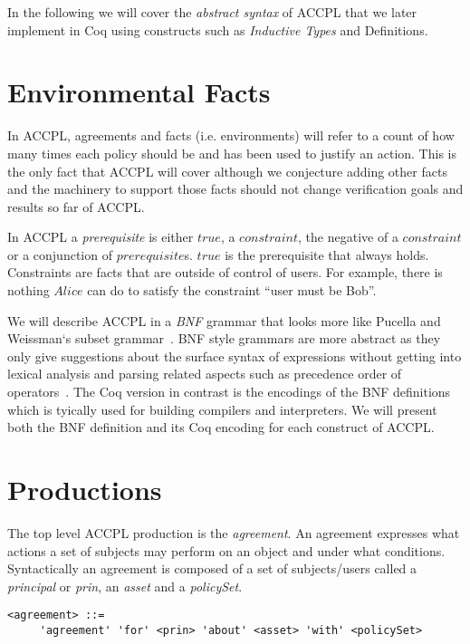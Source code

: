 In the following we will cover the \emph{abstract syntax} of \ac{ACCPL} that we later implement in Coq using constructs such as \emph{Inductive Types} and Definitions. 

\section{Environmental Facts}\label{sec:odrl0}
In \ac{ACCPL}, agreements and facts (i.e. environments) will refer to a count of how many times each policy should be and has been used to justify an action. This is the only fact that \ac{ACCPL} will cover although we conjecture adding other facts and the machinery to support those facts should not change verification goals and results so far of \ac{ACCPL}.

In \ac{ACCPL} a \emph{prerequisite} is either $true$, a $constraint$, the negative of a $constraint$ or a conjunction of $prerequisite$s. $true$ is the prerequisite that always holds. Constraints are facts that are outside of control of users. For example, there is nothing $Alice$ can do to satisfy the constraint ``user must be Bob''. 

We will describe \ac{ACCPL} in a \emph{BNF} grammar that looks more like Pucella and Weissman`s subset grammar~\cite{pucella2006}. BNF style grammars are more abstract as they only give suggestions about the surface syntax of expressions without getting into lexical analysis and parsing related aspects such as precedence order of operators~\cite{piercesf2011}. The Coq version in contrast is the encodings of the BNF definitions which is tyically used for building compilers and interpreters. We will present both the BNF definition and its Coq encoding for each construct of \ac{ACCPL}. 


\section{Productions} \label{sec:productionast}

The top level \ac{ACCPL} production is the \emph{agreement}. An agreement expresses what actions a set of subjects may perform on an object and under what conditions. Syntactically an agreement is composed of a set of subjects/users called a \emph{principal} or \emph{prin}, an \emph{asset} and a \emph{policySet}.

\lstset{language=AST}
\begin{lstlisting}[frame=single, caption={agreement},label={lst:agreementast}]
<agreement> ::= 
     'agreement' 'for' <prin> 'about' <asset> 'with' <policySet> 
\end{lstlisting}

